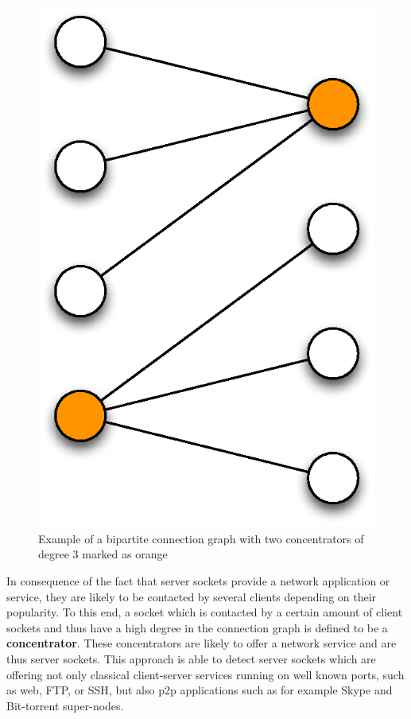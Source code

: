 \begin{figure}
	[h] \centering
	\includegraphics[width=\linewidth/3]{images/connection_graph.eps} \caption{Example of a bipartite connection graph with two concentrators of degree 3 marked as orange}
	\label{fig:bipartite_graph}
\end{figure}

In consequence of the fact that \glspl{server socket} provide a network application or service, they are likely to be contacted by several clients depending on their popularity. To this end, a socket which is contacted by a certain amount of client sockets and thus have a high degree in the connection graph is defined to be a \textbf{concentrator}. These concentrators are likely to offer a network service and are thus \glspl{server socket}. This approach is able to detect \glspl{server socket} which are offering not only classical client-server services running on well known ports, such as web, \gls{FTP}, or \gls{SSH}, but also \gls{p2p} applications such as for example Skype and Bit-torrent super-nodes.

